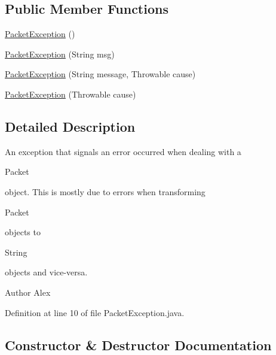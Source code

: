 \subsection*{Public Member Functions}
\begin{DoxyCompactItemize}
\item 
\hyperlink{classpt_1_1up_1_1fe_1_1lpro1613_1_1sharedlib_1_1exceptions_1_1_packet_exception_ad33ebb985e775f252fff77d7d859ac58}{Packet\+Exception} ()
\item 
\hyperlink{classpt_1_1up_1_1fe_1_1lpro1613_1_1sharedlib_1_1exceptions_1_1_packet_exception_a8710c289a2dd416a1ad7d25248021f9d}{Packet\+Exception} (String msg)
\item 
\hyperlink{classpt_1_1up_1_1fe_1_1lpro1613_1_1sharedlib_1_1exceptions_1_1_packet_exception_aabf4cbacec06473f617c9b8d23829640}{Packet\+Exception} (String message, Throwable cause)
\item 
\hyperlink{classpt_1_1up_1_1fe_1_1lpro1613_1_1sharedlib_1_1exceptions_1_1_packet_exception_ad29eb9640b76bd84e41d523a135b9d88}{Packet\+Exception} (Throwable cause)
\end{DoxyCompactItemize}


\subsection{Detailed Description}
An exception that signals an error occurred when dealing with a 
\begin{DoxyCode}
Packet 
\end{DoxyCode}
 object. This is mostly due to errors when transforming 
\begin{DoxyCode}
Packet 
\end{DoxyCode}
 objects to
\begin{DoxyCode}
String 
\end{DoxyCode}
 objects and vice-\/versa.

\begin{DoxyAuthor}{Author}
Alex 
\end{DoxyAuthor}


Definition at line 10 of file Packet\+Exception.\+java.



\subsection{Constructor \& Destructor Documentation}
\hypertarget{classpt_1_1up_1_1fe_1_1lpro1613_1_1sharedlib_1_1exceptions_1_1_packet_exception_ad33ebb985e775f252fff77d7d859ac58}{}\label{classpt_1_1up_1_1fe_1_1lpro1613_1_1sharedlib_1_1exceptions_1_1_packet_exception_ad33ebb985e775f252fff77d7d859ac58} 
